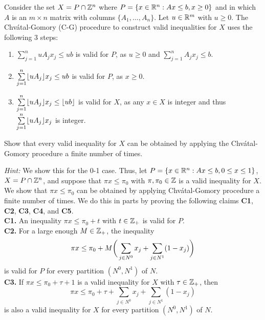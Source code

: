 Consider the set $X = P \cap \mathbb{Z}^n$ where $P = \{x \in \mathbb{R}^n : Ax \leq b, x\geq 0 \}$ and in which $A$ is an $m \times n$ matrix with columns $\{A_1, \dots, A_n\}$. Let $u \in \mathbb{R}^m$ with $u\geq 0$. The Chvátal-Gomory (C-G) procedure to construct valid inequalities for $X$ uses the following 3 steps:
    \begin{enumerate}
        \item $\sum\limits_{j=1}^n uA_jx_j \leq ub$ is valid for $P$, as $u\geq 0$ and $\sum\limits_{j=1}^n A_jx_j \leq b$.
        \item $\sum\limits_{j=1}^n \lfloor uA_j \rfloor x_j \leq ub$ is valid for $P$, as $x \geq 0$.
        \item $\sum\limits_{j=1}^n  \lfloor uA_j \rfloor x_j \leq \lfloor ub \rfloor$ is valid for $X$, as any $x\in X$ is integer and thus $\sum\limits_{j=1}^n\lfloor uA_j \rfloor x_j$ is integer.
    \end{enumerate}
Show that every valid inequality for $X$ can be obtained by applying the Chvátal-Gomory procedure a finite number of times.

\emph{Hint:} We show this for the 0-1 case. Thus, let $P = \{x\in \mathbb{R}^n : Ax\leq b, 0\leq x \leq 1\}$, $X = P \cap \mathbb{Z}^n$, and suppose that $\pi x \leq \pi_0$ with $\pi,\pi_0\in \mathbb{Z}$ is a valid inequality for $X$. We show that $\pi x \leq \pi_0$ can be obtained by applying Chvátal-Gomory procedure a finite number of times. We do this in parts by proving the following claims \textbf{C1}, \textbf{C2}, \textbf{C3}, \textbf{C4}, and \textbf{C5}.\\

\textbf{C1.} An inequality $\pi x \leq \pi_0 + t$ with $t\in \mathbb{Z}_+$ is valid for $P$.\\

\textbf{C2.} For a large enough $M\in \mathbb{Z}_+$, the inequality 
\begin{equation}\label{eq:M}
\pi x \leq \pi_0 + M\bigg{(}\sum_{j\in N^0}x_j + \sum_{j\in N^1}(1-x_j)\bigg{)}
\end{equation}
is valid for $P$ for every partition $(N^0,N^1)$ of $N$.\\

\textbf{C3.} If $\pi x \leq \pi_0 + \tau + 1$ is a valid inequality for $X$ with $\tau\in \mathbb{Z}_+$, then
\begin{equation}\label{eq:tau}
\pi x \leq \pi_0 + \tau + \sum_{j\in N^0} x_j + \sum_{j\in N^1}(1-x_j)
\end{equation}
is also a valid inequality for $X$ for every partition $(N^0,N^1)$ of $N$.\\

